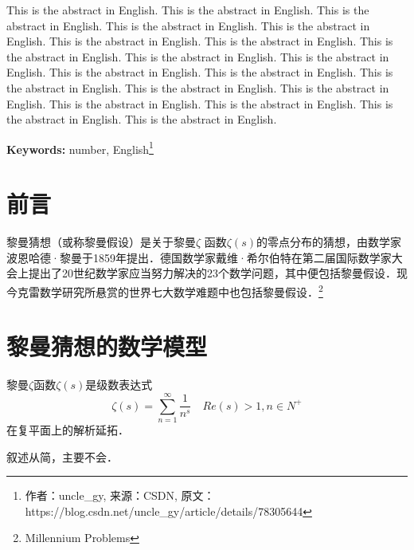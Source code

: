 	\begin{enabstract}
		This is the abstract in English.    This is the abstract in English.    This is the abstract in English.    This is the abstract in English.    This is the abstract in English.    This is the abstract in English.    This is the abstract in English.    This is the abstract in English.    This is the abstract in English.    This is the abstract in English.    This is the abstract in English.    This is the abstract in English.    This is the abstract in English.    This is the abstract in English.    This is the abstract in English.    This is the abstract in English.    This is the abstract in English.    This is the abstract in English.    This is the abstract in English.
			
	\textbf{Keywords:}  number, English\footnote[4]{作者：uncle\_gy, 
			来源：CSDN,  
			原文：https://blog.csdn.net/uncle\_gy/article/details/78305644 }
	\end{enabstract} 
\begin{multicols*}{2}%
	\section{前言}					
	黎曼猜想（或称黎曼假设）是关于黎曼$\zeta$ 函数$\zeta(s)$的零点分布的猜想，由数学家波恩哈德·黎曼于1859年提出．德国数学家戴维·希尔伯特在第二届国际数学家大会上提出了20世纪数学家应当努力解决的23个数学问题，其中便包括黎曼假设．现今克雷数学研究所悬赏的世界七大数学难题中也包括黎曼假设．\footnote[5]{Millennium Problems}
	\section{黎曼猜想的数学模型}
	黎曼$\zeta$函数$\zeta(s)$是级数表达式
	$$
	\zeta(s)=\sum_{n=1}^{\infty}{\frac{1}{n^{s}}}\quad {Re(s)>1,n\in N^{+}}
	$$
	在复平面上的解析延拓．

	叙述从简，主要不会．	
\end{multicols*}
